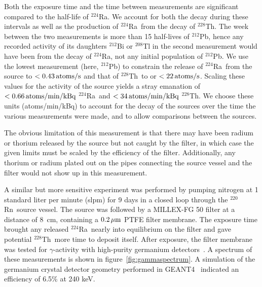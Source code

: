 Both the exposure time and the time between measurements are significant compared to the half-life of $^{224}$Ra. We account for both the decay during these intervals as well as the production of $^{224}$Ra~from the decay of $^{228}$Th. The week between the two measurements is more than 15 half-lives of $^{212}$Pb, hence any recorded activity of its daughters $^{212}$Bi or $^{208}$Tl in the second measurement would have been from the decay of $^{224}$Ra, not any initial population of $^{212}$Pb. We use the lowest measurement (here, $^{212}$Pb) to constrain the release of $^{224}$Ra~from the source to $<0.43\,\mathrm{atoms/s}$ and that of $^{228}$Th~to or $<22\,\mathrm{atoms/s}$. Scaling these values for the activity of the source yields a stray emanation of $<0.66\,\mathrm{atoms/min/kBq}$ $^{224}$Ra~and $<34\,\mathrm{atoms/min/kBq}$ $^{228}$Th. We choose these units (atoms/min/kBq) to account for the decay of the sources over the time the various measurements were made, and to allow comparisons between the sources.

The obvious limitation of this measurement is that there may have been radium or thorium released by the source but not caught by the filter, in which case the given limits must be scaled by the efficiency of the filter. Additionally, any thorium or radium plated out on the pipes connecting the source vessel and the filter would not show up in this measurement.

A similar but more sensitive experiment was performed by pumping nitrogen at 1 standard liter per minute (slpm) for 9 days in a closed loop through the $^{220}$Rn~source vessel. The source was followed by a MILLEX-FG 50 filter at a distance of 8~cm, containing a $0.2\,\mathrm{\mu m}$ PTFE filter membrane. The exposure time brought any released $^{224}$Ra~nearly into equilibrium on the filter and gave potential $^{228}$Th~more time to deposit itself. After exposure, the filter membrane was tested for $\gamma$-activity with high-purity germanium detectors~\cite{Budjas:2007,Budjas:2009}. A spectrum of these measurements is shown in figure~\ref{fig:gammaspectrum}. A simulation of the germanium crystal detector geometry performed in GEANT4~\cite{Geant4} indicated an efficiency of 6.5\% at 240 keV.

